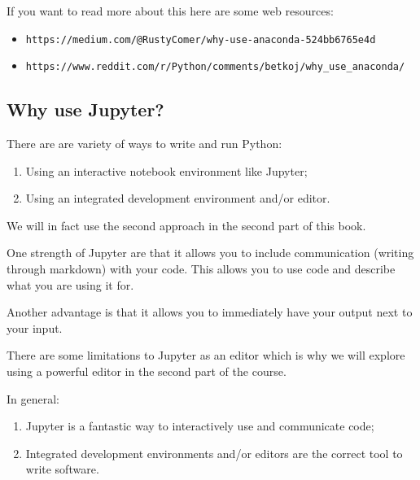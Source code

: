 If you want to read more about this here are some web resources:
\begin{itemize}
\item 

\texttt{https://medium.com/@RustyComer/why-use-anaconda-524bb6765e4d}

\item 

\texttt{https://www.reddit.com/r/Python/comments/betkoj/why\_use\_anaconda/}

\end{itemize}


\subsection{Why use Jupyter?}

There are are variety of ways to write and run Python:
\begin{enumerate}

\item 

Using an interactive notebook environment like Jupyter;

\item 

Using an integrated development environment and/or editor.

\end{enumerate}


We will in fact use the second approach in the second part of this book.


One strength of Jupyter are that it allows you to include communication (writing
through markdown) with your code. This allows you to use code and describe what
you are using it for.


Another advantage is that it allows you to immediately have your output next to your input.


There are some limitations to Jupyter as an editor which is why we will explore
using a powerful editor in the second part of the course.


In general:
\begin{enumerate}

\item 

Jupyter is a fantastic way to interactively use and communicate code;

\item 

Integrated development environments and/or editors are the correct tool to
write software.

\end{enumerate}


